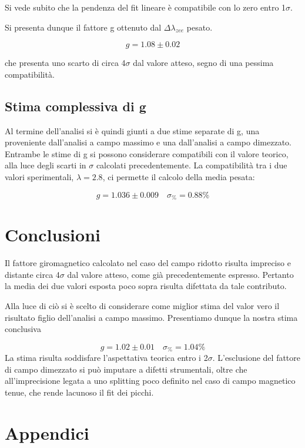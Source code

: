 \documentclass{article}
\begin{document}
	Si vede subito che la pendenza del fit lineare è compatibile con lo zero entro 1$\sigma$.

	Si presenta dunque il fattore g ottenuto dal $\Delta\lambda_{zee}$ pesato.

	\[
		g = 1.08 \pm 0.02	
	\]
	
	che presenta uno scarto di circa 4$\sigma$ dal valore atteso, segno di una pessima compatibilità.

	\subsection*{Stima complessiva di g}

	Al termine dell'analisi si è quindi giunti a due stime separate di g, una proveniente dall'analisi 
	a campo massimo e una dall'analisi a campo dimezzato. Entrambe le stime di g si possono considerare
	compatibili con il valore teorico, alla luce degli scarti in $\sigma$ calcolati precedentemente. 
	La compatibilità tra i due valori sperimentali, $\lambda = 2.8$, ci permette il calcolo della media
	pesata:

	\[
		g = 1.036 \pm 0.009	\quad \sigma_{\%} = 0.88 \%
	\]



	\section*{Conclusioni}

	Il fattore giromagnetico calcolato nel caso del campo ridotto risulta impreciso e distante
	circa 4$\sigma$ dal valore atteso, come già precedentemente espresso. Pertanto la media dei due valori
	esposta poco sopra risulta difettata da tale contributo. 
	
	Alla luce di ciò si è scelto di considerare come miglior stima del valor vero il risultato figlio
	dell'analisi a campo massimo.
	Presentiamo dunque la nostra stima conclusiva

	\[
		g = 1.02 \pm 0.01	\quad \sigma_{\%} = 1.04\%
	\]
	La stima risulta soddisfare l'aspettativa teorica entro i 2$\sigma$.
	L'esclusione del fattore di campo dimezzato si può imputare a difetti strumentali, oltre che
	all'imprecisione legata a uno splitting poco definito nel caso di campo magnetico tenue, che rende 
	lacunoso il fit dei picchi.
  
 	\newpage
	\appendix
	\section{Appendici}
	\label{appendice}
\end{document}
